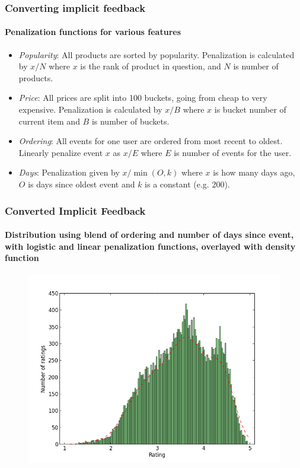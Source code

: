\documentclass{beamer}
\begin{document}
  \begin{frame}
    \frametitle{Converting implicit feedback}
    \framesubtitle{Penalization functions for various features}
    \begin{itemize}
      \item \textit{Popularity}: All products are sorted by popularity.
      Penalization is calculated by $x/N$ where $x$ is the rank of product in
      question, and $N$ is number of products.
      \item \textit{Price}: All prices are split into 100 buckets, going from
      cheap to very expensive. Penalization is calculated by $x/B$ where $x$ is
      bucket number of current item and $B$ is number of buckets.
      \item \textit{Ordering}: All events for one user are ordered from most
      recent to oldest. Linearly penalize event $x$ as $x/E$ where $E$ is
      number of events for the user.
      \item \textit{Days}: Penalization given by $x/\min({O,k})$ where $x$ is how many
      days ago, $O$ is days since oldest event and $k$ is a constant (e.g. 200).
    \end{itemize}
  \end{frame}

  \begin{frame}
    \frametitle{Converted Implicit Feedback}
    \framesubtitle{Distribution using blend of ordering and number of days since event, with logistic and linear penalization functions, overlayed with density function}
    \begin{figure}[H]
        \includegraphics[scale=0.4]{../src/image/dist-blend-price-popularity-recentness}
        \centering
    \end{figure}
  \end{frame}
\end{document}
